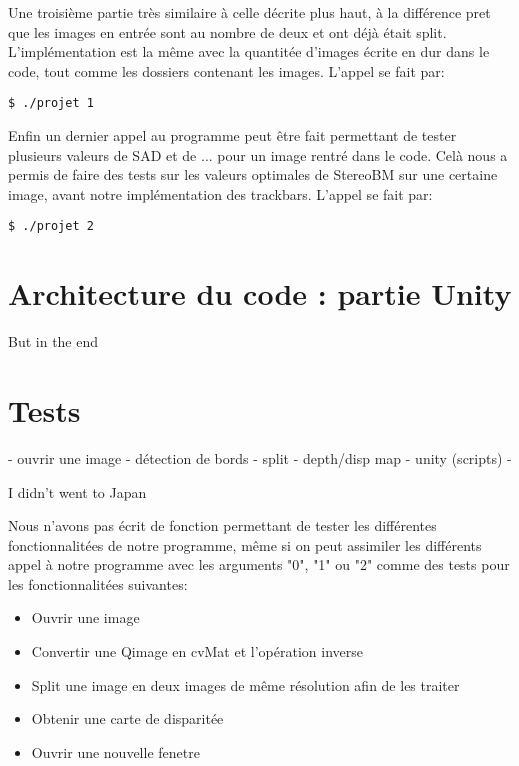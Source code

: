 \documentclass[a4paper]{article}
\begin{document}
Une troisième partie très similaire à celle décrite plus haut, à la différence pret que les images en entrée sont au nombre de deux et ont déjà était split. L'implémentation est la même avec la quantitée d'images écrite en dur dans le code, tout comme les dossiers contenant les images. L'appel se fait par:
\begin{verbatim}
$ ./projet 1
\end{verbatim}

Enfin un dernier appel au programme peut être fait permettant de tester plusieurs valeurs de SAD  et de ... pour un image rentré dans le code. Celà nous a permis de faire des tests sur les valeurs optimales de StereoBM sur une certaine image, avant notre implémentation des trackbars. L'appel se fait par:
\begin{verbatim}
$ ./projet 2
\end{verbatim}




\section{Architecture du code : partie Unity}

But in the end


\section{Tests}

- ouvrir une image
- détection de bords
- split
- depth/disp map
- unity (scripts)
-

I didn't went to Japan

Nous n'avons pas écrit de fonction permettant de tester les différentes fonctionnalitées de notre programme, même si on peut assimiler les différents appel à notre programme avec les arguments "0", "1" ou "2" comme des tests pour les fonctionnalitées suivantes:
\begin{itemize}
\item Ouvrir une image
\item Convertir une Qimage en cvMat et l'opération inverse
\item Split une image en deux images de même résolution afin de les traiter
\item Obtenir une carte de disparitée
\item Ouvrir une nouvelle fenetre

\end{itemize}
\end{document}
